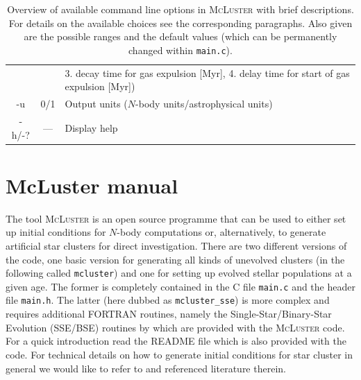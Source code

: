 \documentclass[useAMS,usenatbib]{mn2e}
\begin{document}
\begin{table}
\begin{minipage}{\textwidth}
{\begin{tabular}{ccl}
         & & 3. decay time for gas expulsion [Myr], 4. delay time for start of gas expulsion [Myr])  \\
      -u  & 0/1 & Output units ($N$-body units/astrophysical units)\\           
      -h/-? & --- & Display help                                        
\end{tabular}
}
\caption{Overview of available command line options in \textsc{McLuster} with brief descriptions. For details on the available choices see the corresponding paragraphs. Also given are the possible ranges and the default values (which can be permanently changed within \texttt{main.c}).}
\end{minipage}
\label{overviewtable}
\end{table}

\section*{McLuster manual}
\noindent The tool \textsc{McLuster} is an open source programme that can be used to either set up initial conditions for $N$-body computations or, alternatively, to generate artificial star clusters for direct investigation. There are two different versions of the code, one basic version for generating all kinds of unevolved clusters (in the following called \texttt{mcluster}) and one for setting up evolved stellar populations at a given age. The former is completely contained in the \textsc{C} file \texttt{main.c} and the header file \texttt{main.h}. The latter (here dubbed as \texttt{mcluster\_sse}) is more complex and requires additional \textsc{FORTRAN} routines, namely the Single-Star/Binary-Star Evolution (\textsc{SSE/BSE}) routines by \citet{Hurley00, Hurley02} which are provided with the \textsc{McLuster} code. For a quick introduction read the README file which is also provided with the code. For technical details on how to generate initial conditions for star cluster in general we would like to refer to \citet{Kroupa08} and referenced literature therein. 
\end{document}
